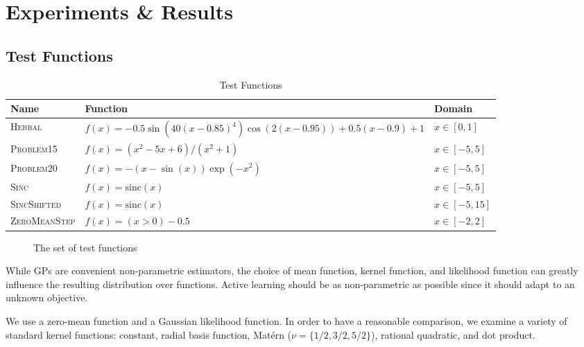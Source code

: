 \documentclass[conference]{IEEEtran}
\begin{document}
	\section{Experiments \& Results}
	\label{sec:experiments-results}
	
	\subsection{Test Functions}
	
	\begin{table*}[!h]
    \renewcommand{\arraystretch}{1.3}
    \centering
    \caption{Test Functions}
    \label{tab:test_fns}
        \begin{tabular}{lll}
        \toprule 
        \bfseries Name & \bfseries Function & \bfseries Domain \\ \midrule
	    \textsc{Hebbal} & $f(x) = -0.5 \sin\left(40 (x-0.85)^4\right) \cos(2(x-0.95)) + 0.5(x-0.9) + 1$ & $x \in [0, 1]$ \\
	    \textsc{Problem15} & $f(x) = (x^2 - 5x + 6) / (x^2 + 1) $ & $x \in [-5, 5]$ \\
	    \textsc{Problem20} & $f(x) = -(x - \sin(x))\exp(-x^2) $ & $x \in [-5, 5]$ \\
	    \textsc{Sinc} & $f(x) = \text{sinc}(x) $ & $x \in [-5, 5]$ \\
	    \textsc{SincShifted} & $f(x) = \text{sinc}(x) $ & $x \in [-5, 15]$ \\
	    \textsc{ZeroMeanStep} & $f(x) = (x > 0) - 0.5 $ & $x \in [-2, 2]$ \\
	    \bottomrule
	    \end{tabular}
	\end{table*}
	
	\begin{figure*}[!h]
	    \centering
	    
	    \caption{The set of test functions}
	    \label{fig:test_fns}
	\end{figure*}
	
	While GPs are convenient non-parametric estimators, the choice of mean function, kernel function, and likelihood function can greatly influence the resulting distribution over functions. Active learning should be as non-parametric as possible since it should adapt to an unknown objective.
	
	We use a zero-mean function and a Gaussian likelihood function. In order to have a reasonable comparison, we examine a variety of standard kernel functions: constant, radial basis function, Mat\'ern ($\nu = \{1/2, 3/2, 5/2\}$), rational quadratic, and dot product. 
	
\end{document}
